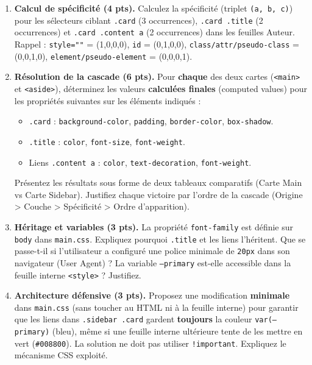 \documentclass[11pt]{article}
\begin{document}
\begin{exercice}
\begin{enumerate}
\item \textbf{Calcul de spécificité (4 pts).} Calculez la spécificité (triplet \texttt{(a, b, c)}) pour les sélecteurs ciblant \texttt{.card} (3 occurrences), \texttt{.card .title} (2 occurrences) et \texttt{.card .content a} (2 occurrences) dans les feuilles Auteur. Rappel : \texttt{style=""} = (1,0,0,0), \texttt{id} = (0,1,0,0), \texttt{class/attr/pseudo-class} = (0,0,1,0), \texttt{element/pseudo-element} = (0,0,0,1).
\item \textbf{Résolution de la cascade (6 pts).} Pour \textbf{chaque} des deux cartes (\texttt{<main>} et \texttt{<aside>}), déterminez les valeurs \textbf{calculées finales} (computed values) pour les propriétés suivantes sur les éléments indiqués :
      \begin{itemize}
          \item \texttt{.card} : \texttt{background-color}, \texttt{padding}, \texttt{border-color}, \texttt{box-shadow}.
          \item \texttt{.title} : \texttt{color}, \texttt{font-size}, \texttt{font-weight}.
          \item Liens \texttt{.content a} : \texttt{color}, \texttt{text-decoration}, \texttt{font-weight}.
      \end{itemize}
      Présentez les résultats sous forme de deux tableaux comparatifs (Carte Main vs Carte Sidebar). Justifiez chaque victoire par l'ordre de la cascade (Origine > Couche > Spécificité > Ordre d'apparition).
\item \textbf{Héritage et variables (3 pts).} La propriété \texttt{font-family} est définie sur \texttt{body} dans \texttt{main.css}. Expliquez pourquoi \texttt{.title} et les liens l'héritent. Que se passe-t-il si l'utilisateur a configuré une police minimale de \texttt{20px} dans son navigateur (User Agent) ? La variable \texttt{--primary} est-elle accessible dans la feuille interne \texttt{<style>} ? Justifiez.
\item \textbf{Architecture défensive (3 pts).} Proposez une modification \textbf{minimale} dans \texttt{main.css} (sans toucher au HTML ni à la feuille interne) pour garantir que les liens dans \texttt{.sidebar .card} gardent \textbf{toujours} la couleur \texttt{var(--primary)} (bleu), même si une feuille interne ultérieure tente de les mettre en vert (\texttt{\#008800}). La solution ne doit pas utiliser \texttt{!important}. Expliquez le mécanisme CSS exploité.
\end{enumerate}
\end{exercice}
\end{document}
